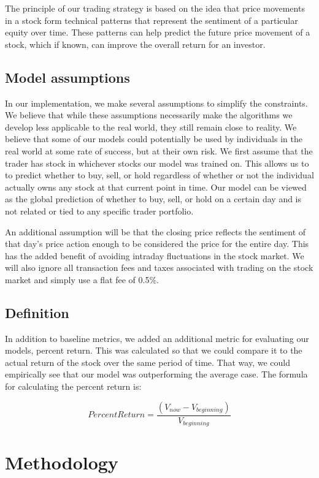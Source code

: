 \documentclass{article}
\begin{document}
The principle of our trading strategy is based on the idea that price movements in a stock form technical patterns that represent the sentiment of a particular equity over time. These patterns can help predict the future price movement of a stock, which if known, can improve the overall return for an investor.

\subsection{Model assumptions}
In our implementation, we make several assumptions to simplify the constraints. We believe that while these assumptions necessarily make the algorithms we develop less applicable to the real world, they still remain close to reality. We believe that some of our models could potentially be used by individuals in the real world at some rate of success, but at their own risk. We first assume that the trader has stock in whichever stocks our model was trained on. This allows us to to predict whether to buy, sell, or hold regardless of whether or not the individual actually owns any stock at that current point in time. Our model can be viewed as the global prediction of whether to buy, sell, or hold on a certain day and is not related or tied to any specific trader portfolio.

An additional assumption will be that the closing price reflects the sentiment of that day's price action enough to be considered the price for the entire day. This has the added benefit of avoiding intraday fluctuations in the stock market. We will also ignore all transaction fees and taxes associated with trading on the stock market and simply use a flat fee of 0.5\%.

\subsection{Definition}
In addition to baseline metrics, we added an additional metric for evaluating our models, percent return. This was calculated so that we could compare it to the actual return of the stock over the same period of time. That way, we could empirically see that our model was outperforming the average case. The formula for calculating the percent return is:

$$
Percent Return = \frac{(V_{now} - V_{beginning})}{V_{beginning}}
$$

\section{Methodology}
\end{document}
